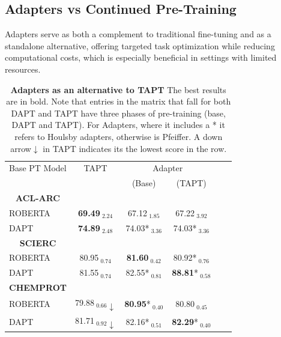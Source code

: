 \documentclass[10pt,twocolumn,letterpaper]{article}
\begin{document}
\subsection{Adapters vs Continued Pre-Training} 

Adapters serve as both a complement to traditional fine-tuning and as a standalone alternative, offering targeted task optimization while reducing computational costs, which is especially beneficial in settings with limited resources.

\begin{table}[H]
    \centering
    \begin{tabular}{@{}lccccc@{}}
    \hline
    Base PT Model & TAPT & \multicolumn{2}{c}{Adapter} \\
    \cmidrule(lr){2-2} \cmidrule(lr){3-4}
    & & (Base) & (TAPT) \\
    \multicolumn{1}{c}{\textbf{ACL-ARC}} \\
    ROBERTA & \textbf{69.49}$_{\text{ 2.24}}$ & 67.12$_{\text{ 1.85}}$ & 67.22$_{\text{ 3.92}}$ \\
     DAPT & \textbf{74.89}$_{\text{ 2.48}}$ & 74.03*$_{\text{ 3.36}}$ & 74.03*$_{\text{ 3.36}}$ \\
    \hline
    \multicolumn{1}{c}{\textbf{SCIERC}}\\
    ROBERTA & 80.95$_{\text{ 0.74}}$ & \textbf{81.60}$_{\text{ 0.42}}$ & 80.92*$_{\text{ 0.76}}$ \\
    DAPT & 81.55$_{\text{ 0.74}}$ & 82.55*$_{\text{ 0.81}}$ & \textbf{88.81}*$_{\text{ 0.58}}$ \\
    \hline
    \multicolumn{1}{c}{\textbf{CHEMPROT}}\\
    ROBERTA & 79.88$_{\text{ 0.66}}\downarrow$ & \textbf{80.95}*$_{\text{ 0.40}}$ & 80.80$_{\text{ 0.45}}$ \\
    DAPT & 81.71$_{\text{ 0.92}}\downarrow$ & 82.16*$_{\text{ 0.51}}$ & \textbf{82.29}*$_{\text{ 0.40}}$ \\
\end{tabular}
\caption{\textbf{Adapters as an alternative to TAPT} The best results are in bold. Note that entries in the matrix that fall for both DAPT and TAPT have three phases of pre-training (base, DAPT and TAPT). For Adapters, where it includes a * it refers to Houlsby adapters, otherwise is Pfeiffer. A down arrow$\downarrow$ in TAPT indicates its the lowest score in the row.}
\label{table:adapters_vs_tapt}
\end{table}
\end{document}
